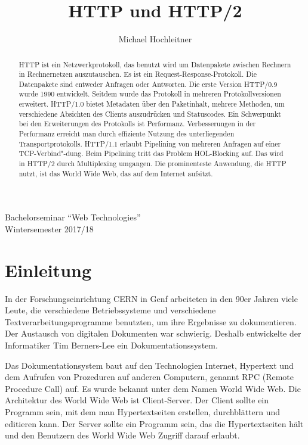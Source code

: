 \documentclass{llncs}
\begin{document}
\title{HTTP und HTTP/2}
\author{Michael Hochleitner}

\maketitle 
\begin{center}
Bachelorseminar ``Web Technologies'' \\
Wintersemester 2017/18
\end{center}

\begin{abstract}
HTTP ist ein Netzwerkprotokoll, das benutzt wird um Datenpakete zwischen Rechnern in Rechnernetzen auszutauschen. Es ist ein Request-Response-Protokoll. Die Datenpakete sind entweder Anfragen oder Antworten. Die erste Version HTTP/0.9 wurde 1990 entwickelt. Seitdem wurde das Protokoll in mehreren Protokollversionen erweitert. HTTP/1.0 bietet Metadaten über den Paketinhalt, mehrere Methoden, um verschiedene Absichten des Clients auszudrücken  und Statuscodes.
Ein Schwerpunkt bei den Erweiterungen des Protokolls ist Performanz. Verbesserungen in der Performanz erreicht man durch effiziente Nutzung des unterliegenden Transportprotokolls. HTTP/1.1 erlaubt Pipe\-lining von mehreren Anfragen auf einer TCP-Verbind"-dung. Beim Pipe\-lining tritt das Problem HOL-Blocking auf. Das wird in \mbox{HTTP/2} durch Multiplexing umgangen.  Die prominenteste Anwendung, die HTTP nutzt, ist das World Wide Web, das auf dem Internet aufsitzt.
\end{abstract}

\section{Einleitung}
In der Forschungseinrichtung CERN in Genf arbeiteten in den 90er Jahren viele Leute, die verschiedene Betriebssysteme und verschiedene Textverarbeitungsprogramme benutzten, um ihre Ergebnisse zu dokumentieren. Der Austausch von digitalen Dokumenten war schwierig. Deshalb entwickelte der Informatiker Tim Berners-Lee ein Dokumentationssystem. \cite{Berners-Lee1999}

Das Dokumentationsystem baut auf den Technologien Internet, Hypertext und dem Aufrufen von Prozeduren auf anderen Computern, genannt RPC (Remote Procedure Call) auf. Es wurde bekannt unter dem Namen World Wide Web. Die Architektur des World Wide Web ist Client-Server. Der Client sollte ein Programm sein, mit dem man Hypertextseiten erstellen, durchblättern und editieren kann. Der Server sollte ein Programm sein, das die Hypertextseiten hält und den Benutzern des World Wide Web Zugriff darauf erlaubt.\cite{Berners-Lee1999}
\end{document}
